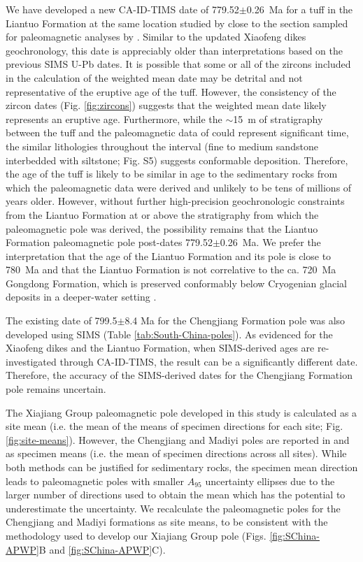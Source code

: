 We have developed a new CA-ID-TIMS date of 779.52$\pm$0.26~Ma for a tuff in the Liantuo Formation at the same location studied by \citet{Ma1984a} close to the section sampled for paleomagnetic analyses by \citet{Evans2000a}. Similar to the updated Xiaofeng dikes geochronology, this date is appreciably older than interpretations based on the previous SIMS U-Pb dates. It is possible that some or all of the zircons included in the calculation of the weighted mean date may be detrital and not representative of the eruptive age of the tuff. However, the consistency of the zircon dates (Fig. \ref{fig:zircons}) suggests that the weighted mean date likely represents an eruptive age. Furthermore, while the $\sim$15~m of stratigraphy between the tuff and the paleomagnetic data of \citet{Evans2000a} could represent significant time, the similar lithologies throughout the interval (fine to medium sandstone interbedded with siltstone; Fig. S5) suggests conformable deposition. Therefore, the age of the tuff is likely to be similar in age to the sedimentary rocks from which the paleomagnetic data were derived and unlikely to be tens of millions of years older. However, without further high-precision geochronologic constraints from the Liantuo Formation at or above the stratigraphy from which the paleomagnetic pole was derived, the possibility remains that the Liantuo Formation paleomagnetic pole post-dates 779.52$\pm$0.26~Ma. We prefer the interpretation that the age of the Liantuo Formation and its pole is close to 780~Ma and that the Liantuo Formation is not correlative to the ca. 720~Ma Gongdong Formation, which is preserved conformably below Cryogenian glacial deposits in a deeper-water setting \citep{Lan2020a}.

The existing date of 799.5$\pm$8.4 Ma for the Chengjiang Formation pole was also developed using SIMS (Table \ref{tab:South-China-poles}). As evidenced for the Xiaofeng dikes and the Liantuo Formation, when SIMS-derived ages are re-investigated through CA-ID-TIMS, the result can be a significantly different date. Therefore, the accuracy of the SIMS-derived dates for the Chengjiang Formation pole remains uncertain.

The Xiajiang Group paleomagnetic pole developed in this study is calculated as a site mean (i.e. the mean of the means of specimen directions for each site; Fig. \ref{fig:site-means}). However, the Chengjiang and Madiyi poles are reported in \citet{Jing2019a} and \citet{Xian2020a} as specimen means (i.e. the mean of specimen directions across all sites). While both methods can be justified for sedimentary rocks, the specimen mean direction leads to paleomagnetic poles with smaller $A_{95}$ uncertainty ellipses due to the larger number of directions used to obtain the mean which has the potential to underestimate the uncertainty. We recalculate the paleomagnetic poles for the Chengjiang and Madiyi formations as site means, to be consistent with the methodology used to develop our Xiajiang Group pole (Figs. \ref{fig:SChina-APWP}B and \ref{fig:SChina-APWP}C).

